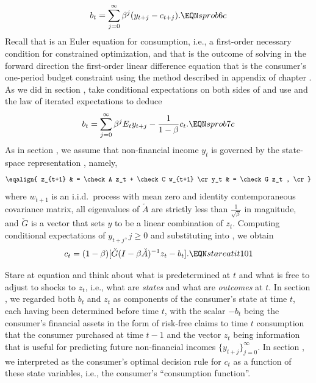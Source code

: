 $$ b_t = \sum_{j=0}^\infty \beta^j (y_{t+j} - c_{t+j}) .  \EQN sprob6c $$
Recall that  is an Euler equation for consumption, i.e., a first-order necessary condition for constrained optimization,
and that  is the outcome of solving in
the  forward direction  the first-order linear difference equation that is  the consumer's one-period budget constraint using the method
 described in appendix  of chapter .
As we did in section , take
conditional expectations on both sides of  and use 
and the law of iterated expectations to deduce
$$ b_t = \sum_{j=0}^\infty \beta^j E_t y_{t+j} - {1 \over 1-\beta} c_t .
\EQN sprob7c $$
As in section , we assume that non-financial income $y_t$ is governed by
the state-space representation , namely,
$$ \eqalign{ z_{t+1} & = \check A z_t + \check C w_{t+1}  \cr
               y_t & = \check G  z_t , \cr}$$
where $w_{t+1}$ is an i.i.d.~process with mean zero and
identity contemporaneous covariance matrix, all  eigenvalues of $\check A$ are strictly less than ${\frac{1}{\sqrt{\beta}}}$ in magnitude,
 and
$\check G$ is a  vector that sets  $y$ to be  a 
linear combination of  $z_t$.
Computing conditional expectations of  $y_{t+j}, j\geq 0$ and substituting into , we obtain
$$  c_t  = (1-\beta) [ \check G(I-\beta \check A)^{-1} z_t - b_t ]  .  \EQN stareatit101 $$



Stare  at equation  and  think about  what is predetermined at $t$ and
what is free to adjust to shocks to $z_t$, i.e., what are {\it states\/}  and what are {\it outcomes\/} at $t$.
   In section , we regarded both $b_t$ and $z_t$ as components of the consumer's  state
at time $t$,  each having been determined before time $t$,  with the scalar $-b_t$  being the consumer's financial assets in the form
of risk-free claims to time $t$ consumption that the consumer purchased at time $t-1$ and the vector $z_t$ being information that is useful for predicting future non-financial
incomes $\{y_{t+j}\}_{j=0}^\infty$.  In section ,  we interpreted   as the  consumer's  optimal decision rule for  $c_t$ as a function of these
state variables,
i.e., the consumer's ``consumption function''.


